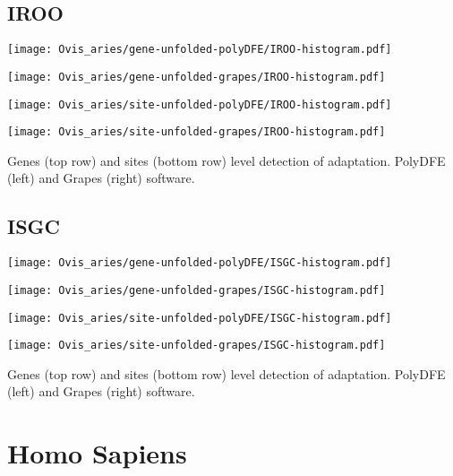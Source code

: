 \documentclass{article}
\begin{document}
\subsection{IROO}
\centering
\begin{minipage}{0.49\linewidth}
    \texttt{[image: Ovis\_aries/gene-unfolded-polyDFE/IROO-histogram.pdf]}
\end{minipage}%
\hfill
\begin{minipage}{0.49\linewidth}
    \texttt{[image: Ovis\_aries/gene-unfolded-grapes/IROO-histogram.pdf]}
\end{minipage}
\begin{minipage}{0.49\linewidth}
    \texttt{[image: Ovis\_aries/site-unfolded-polyDFE/IROO-histogram.pdf]}
\end{minipage}%
\hfill
\begin{minipage}{0.49\linewidth}
    \texttt{[image: Ovis\_aries/site-unfolded-grapes/IROO-histogram.pdf]}
\end{minipage}
\flushleft
Genes (top row) and sites (bottom row) level detection of adaptation.
PolyDFE (left) and Grapes (right) software.

\subsection{ISGC}
\centering
\begin{minipage}{0.49\linewidth}
    \texttt{[image: Ovis\_aries/gene-unfolded-polyDFE/ISGC-histogram.pdf]}
\end{minipage}%
\hfill
\begin{minipage}{0.49\linewidth}
    \texttt{[image: Ovis\_aries/gene-unfolded-grapes/ISGC-histogram.pdf]}
\end{minipage}
\begin{minipage}{0.49\linewidth}
    \texttt{[image: Ovis\_aries/site-unfolded-polyDFE/ISGC-histogram.pdf]}
\end{minipage}%
\hfill
\begin{minipage}{0.49\linewidth}
    \texttt{[image: Ovis\_aries/site-unfolded-grapes/ISGC-histogram.pdf]}
\end{minipage}
\flushleft
Genes (top row) and sites (bottom row) level detection of adaptation.
PolyDFE (left) and Grapes (right) software.


\section{Homo Sapiens}
\end{document}

